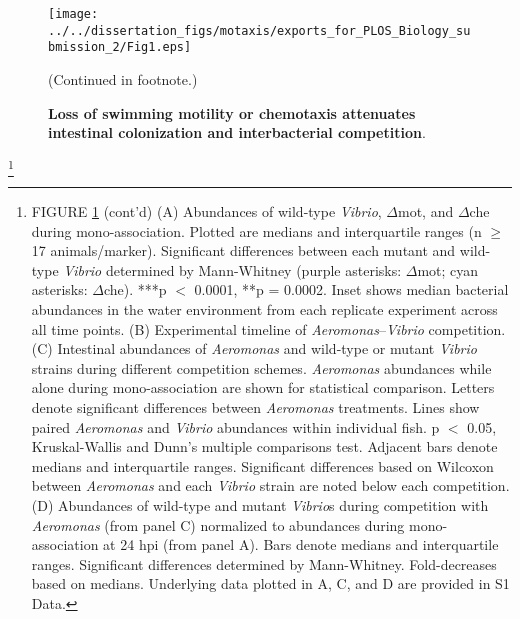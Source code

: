 \begin{figure}%
	\centerline{
		\texttt{[image: ../../dissertation\_figs/motaxis/exports\_for\_PLOS\_Biology\_submission\_2/Fig1.eps]}}
	\caption{\textbf{Loss of swimming motility or chemotaxis attenuates intestinal colonization and interbacterial competition}.}{(Continued in footnote.)}
	\label{fig:motaxis_fig1}
		\end{figure}

{\let\thefootnote\relax\footnote{FIGURE \ref{fig:motaxis_fig1} (cont'd) (A) Abundances of wild-type \textit{Vibrio}, $\Delta$mot, and $\Delta$che during mono-association. Plotted are medians and interquartile ranges (n $\ge$ 17 animals/marker). Significant differences between each mutant and wild-type \textit{Vibrio} determined by Mann-Whitney (purple asterisks: $\Delta$mot; cyan asterisks: $\Delta$che). ***p $ < $ 0.0001, **p = 0.0002. Inset shows median bacterial abundances in the water environment from each replicate experiment across all time points. (B) Experimental timeline of \textit{Aeromonas}–\textit{Vibrio} competition. (C) Intestinal abundances of \textit{Aeromonas} and wild-type or mutant \textit{Vibrio} strains during different competition schemes. \textit{Aeromonas} abundances while alone during mono-association are shown for statistical comparison. Letters denote significant differences between \textit{Aeromonas} treatments. Lines show paired \textit{Aeromonas} and \textit{Vibrio} abundances within individual fish. p $ < $ 0.05, Kruskal-Wallis and Dunn's multiple comparisons test. Adjacent bars denote medians and interquartile ranges. Significant differences based on Wilcoxon between \textit{Aeromonas} and each \textit{Vibrio} strain are noted below each competition. (D) Abundances of wild-type and mutant \textit{Vibrio}s during competition with \textit{Aeromonas} (from panel C) normalized to abundances during mono-association at 24 hpi (from panel A). Bars denote medians and interquartile ranges. Significant differences determined by Mann-Whitney. Fold-decreases based on medians. Underlying data plotted in A, C, and D are provided in S1 Data.}

}
